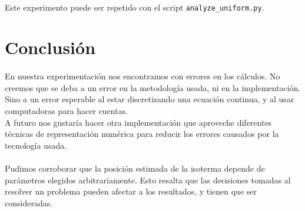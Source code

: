 \documentclass[12pt]{article}
\begin{document}
\paragraph{} Este experimento puede ser repetido con el script \texttt{analyze\_uniform.py}.





\section{Conclusión}

\paragraph{} En nuestra experimentación nos encontramos con errores en los cálculos. No creemos que se deba a un error en la metodología usada, ni en la implementación. Sino a un error esperable al estar discretizando una ecuación continua, y al usar computadoras para hacer cuentas. \\
A futuro nos gustaría hacer otra implementación que aproveche diferentes técnicas de representación numérica para reducir los errores causados por la tecnología usada.
\paragraph{} Pudimos corroborar que la posición estimada de la isoterma depende de parámetros elegidos arbitrariamente. Esto resalta que las decisiones tomadas al resolver un problema pueden afectar a los resultados, y tienen que ser consideradas. 
\end{document}
